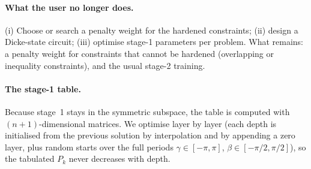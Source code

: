 \paragraph{What the user no longer does.} (i) Choose or search a penalty weight for the hardened
constraints; (ii) design a Dicke-state circuit; (iii) optimise stage-1 parameters per problem.
What remains: a penalty weight for constraints that cannot be hardened (overlapping or inequality
constraints), and the usual stage-2 training.

\paragraph{The stage-1 table.} Because stage~1 stays in the symmetric subspace, the table is computed
with $(n+1)$-dimensional matrices. We optimise layer by layer (each depth is initialised from the
previous solution by interpolation and by appending a zero layer, plus random starts over the full
periods $\gamma\in[-\pi,\pi]$, $\beta\in[-\pi/2,\pi/2]$), so the tabulated $P_k$ never decreases with depth.
